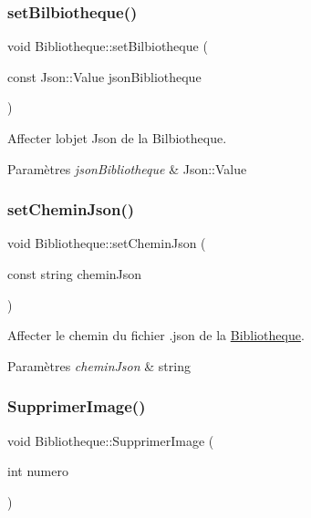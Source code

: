 \subsubsection{\texorpdfstring{set\+Bilbiotheque()}{setBilbiotheque()}}
{\footnotesize\ttfamily void Bibliotheque\+::set\+Bilbiotheque (\begin{DoxyParamCaption}\item[{const Json\+::\+Value}]{json\+Bibliotheque }\end{DoxyParamCaption})}



Affecter l\textquotesingle{}objet Json de la Bilbiotheque. 


\begin{DoxyParams}{Paramètres}
{\em json\+Bibliotheque} & Json\+::\+Value \\
\hline
\end{DoxyParams}
\mbox{\label{classBibliotheque_ac9201ed432b00fc3cd2621db1c8df78b}} 
\subsubsection{\texorpdfstring{set\+Chemin\+Json()}{setCheminJson()}}
{\footnotesize\ttfamily void Bibliotheque\+::set\+Chemin\+Json (\begin{DoxyParamCaption}\item[{const string}]{chemin\+Json }\end{DoxyParamCaption})}



Affecter le chemin du fichier .json de la \hyperlink{classBibliotheque}{Bibliotheque}. 


\begin{DoxyParams}{Paramètres}
{\em chemin\+Json} & string \\
\hline
\end{DoxyParams}
\mbox{\label{classBibliotheque_a3e4940fd008650236beae91780d7b068}} 
\subsubsection{\texorpdfstring{Supprimer\+Image()}{SupprimerImage()}}
{\footnotesize\ttfamily void Bibliotheque\+::\+Supprimer\+Image (\begin{DoxyParamCaption}\item[{int}]{numero }\end{DoxyParamCaption})}



